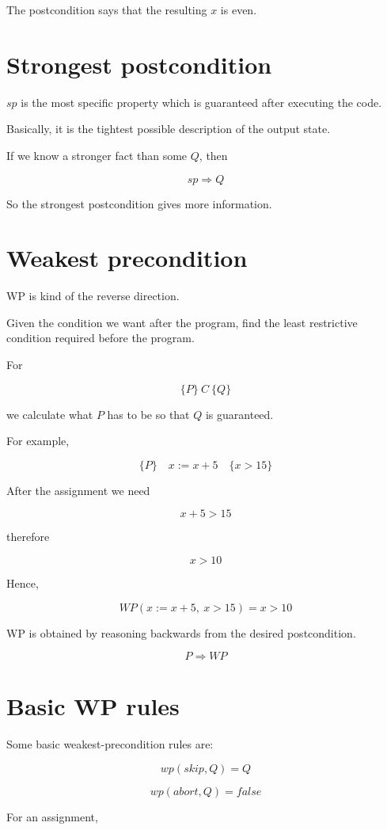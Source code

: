 \documentclass[11pt]{book}
\begin{document}
The postcondition says that the resulting $x$ is even.

\section{Strongest postcondition}

$sp$ is the most specific property which is guaranteed
after executing the code.

Basically, it is the tightest possible description of
the output state.

If we know a stronger fact than some $Q$, then

\[
sp \Rightarrow Q
\]

So the strongest postcondition gives more information.

\section{Weakest precondition}

WP is kind of the reverse direction.

Given the condition we want after the program, find the
least restrictive condition required before the program.

For

\[
\{P\}\ C\ \{Q\}
\]

we calculate what $P$ has to be so that $Q$ is guaranteed.

For example,

\[
\{P\}\quad x:=x+5\quad\{x>15\}
\]

After the assignment we need

\[
x+5>15
\]

therefore

\[
x>10
\]

Hence,

\[
WP(x:=x+5,\ x>15)=x>10
\]

WP is obtained by reasoning backwards from the desired
postcondition.

\[
P \Rightarrow WP
\]

\section{Basic WP rules}

Some basic weakest-precondition rules are:

\[
wp(skip,Q)=Q
\]

\[
wp(abort,Q)=false
\]

For an assignment,
\end{document}
